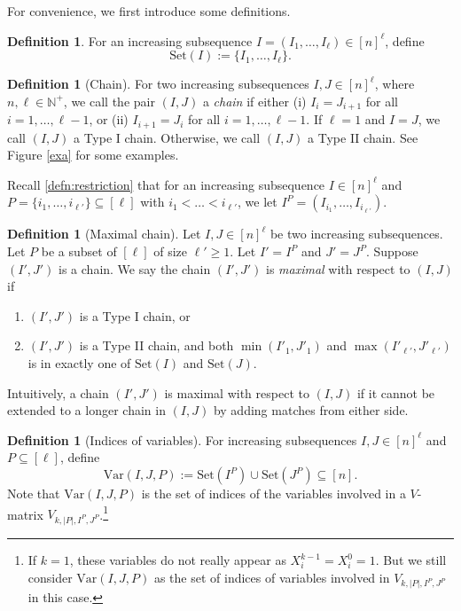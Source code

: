 \documentclass[11pt]{article}
\theoremstyle{plain}
\theoremstyle{definition}
\newtheorem{defn}[thm]{Definition}
\theoremstyle{remark}
\newcommand{\N}{\mathbb{N}}
\newcommand{\range}{\mathrm{Set}}
\newcommand{\var}{\mathrm{Var}}
\begin{document}
For convenience, we first introduce some definitions. 

\begin{defn}
For an increasing subsequence $I=(I_1,\dots,I_{\ell})\in [n]^{\ell}$, define
\[
\range(I):=\{I_1,\dots, I_{\ell}\}.
\]
\end{defn}

\begin{defn}[Chain]
\label{defn:chain}
For two increasing subsequences $I,J\in[n]^\ell$, where $n,\ell\in\N^+$, we call the pair $(I,J)$ a \textit{chain} if either (i) $I_{i} = J_{i+1}$ for all $i=1,\dots,\ell-1$, or (ii) $I_{i+1} = J_{i}$ for all $i=1,\dots,\ell-1$.
If $\ell=1$ and $I=J$, we call $(I,J)$ a Type I chain. Otherwise, we call $(I,J)$ a Type II chain. See Figure \ref{exa} for some examples. 
\end{defn}

Recall \cref{defn:restriction} that for an increasing subsequence $I\in [n]^{\ell}$ and $P=\{i_1,\dots,i_{\ell'}\}\subseteq [\ell]$ with $i_1<\dots<i_{\ell'}$, we let $I^P=(I_{i_1},\dots,I_{i_{\ell'}})$.


\begin{defn}[Maximal chain]\label{defn:maximal-chain}
Let $I,J\in[n]^{\ell}$ be two increasing subsequences.
Let $P$ be a subset of $[\ell]$ of size $\ell'\geq 1$.
Let $I'=I^P$ and $J'=J^P$. Suppose $(I',J')$ is a chain. 
We say the chain $(I',J')$ is \emph{maximal} with respect to $(I,J)$ if 
\begin{enumerate}
\item $(I',J')$ is a Type I chain, or 
\item $(I',J')$ is a Type II chain, and both $\min(I'_1,J'_1)$ and $\max(I'_{\ell'},J'_{\ell'})$ is in exactly one of $\range(I)$ and $\range(J)$.
\end{enumerate}
\end{defn}

Intuitively, a chain $(I', J')$ is maximal with respect to $(I,J)$ if it cannot be extended to a longer chain in $(I,J)$ by adding matches from either side.


\begin{defn}[Indices of variables]
For increasing subsequences $I,J\in [n]^{\ell}$ and $P\subseteq [\ell]$, define
\[
\var(I,J,P):=\range(I^P)\cup\range(J^P)\subseteq [n].
\]
Note that $\var(I,J,P)$ is the set of indices of the variables involved in a $V$-matrix $V_{k,|P|,I^P, J^P}$.\footnote{If $k=1$, these variables do not really appear as $X_i^{k-1}=X_i^0=1$. But we still consider $\var(I,J,P)$ as the set of indices of variables involved in $V_{k,|P|,I^P, J^P}$ in this case.}
\end{defn}
\end{document}

